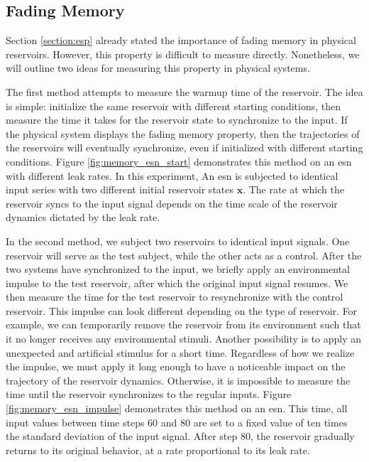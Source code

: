 \subsection{Fading Memory} \label{sec:fading_memory}

Section \ref{section:esp} already stated the importance of fading memory in physical reservoirs.
However, this property is difficult to measure directly.
Nonetheless, we will outline two ideas for measuring this property in physical systems.


The first method attempts to measure the warmup time of the reservoir. 
The idea is simple: initialize the same reservoir with different starting conditions, then measure the time it takes for the reservoir state to synchronize to the input.
If the physical system displays the fading memory property, then the trajectories of the reservoirs will eventually synchronize, even if initialized with different starting conditions.
Figure \ref{fig:memory_esn_start} demonstrates this method on an \acrshort{esn} with different leak rates. 
In this experiment, An \acrshort{esn} is subjected to identical input series with two different initial reservoir states $\mathbf{x}$.
The rate at which the reservoir syncs to the input signal depends on the time scale of the reservoir dynamics dictated by the leak rate.

In the second method, we subject two reservoirs to identical input signals. 
One reservoir will serve as the test subject, while the other acts as a control.
After the two systems have synchronized to the input, we briefly apply an environmental impulse to the test reservoir, after which the original input signal resumes.
We then measure the time for the test reservoir to resynchronize with the control reservoir.
This impulse can look different depending on the type of reservoir. 
For example, we can temporarily remove the reservoir from its environment such that it no longer receives any environmental stimuli.
Another possibility is to apply an unexpected and artificial stimulus for a short time.
Regardless of how we realize the impulse, we must apply it long enough to have a noticeable impact on the trajectory of the reservoir dynamics.
Otherwise, it is impossible to measure the time until the reservoir synchronizes to the regular inputs.
Figure \ref{fig:memory_esn_impulse} demonstrates this method on an \acrshort{esn}.
This time, all input values between time steps 60 and 80 are set to a fixed value of ten times the standard deviation of the input signal.
After step 80, the reservoir gradually returns to its original behavior, at a rate proportional to its leak rate.


